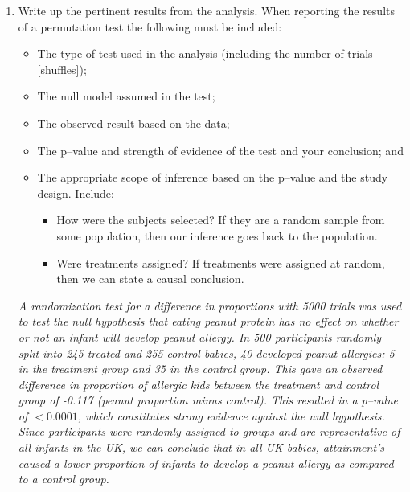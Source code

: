 \begin{enumerate}
    \item \label{reportBullets} Write up  the pertinent
      results from the analysis. When reporting the
      results of a permutation test the following must be included:
      \begin{itemize}
      \item The type of test used in the analysis (including the
        number of trials [shuffles]);\vspace{2cm}
      \item The null model assumed in the test;\vspace{2cm}
      \item The observed result based on the data;\vspace{2cm}
      \item The p--value and strength of evidence of the test and your
        conclusion; and\vspace{2cm}
      \item The appropriate scope of inference based on the p--value
        and the study design.  Include:
        \begin{itemize}
        \item How were the subjects selected?  If they are a random
          sample from some population, then our inference goes back to
          the population.\vspace{2cm}
        \item Were treatments assigned?  If treatments were assigned
          at random, then we can state a causal conclusion.\vspace{2cm}
        \end{itemize}
      \end{itemize}
\begin{key}
 {\it      A randomization test for a difference in proportions with
      5000 trials was used to test the null hypothesis that eating
      peanut protein has no effect on whether or not an infant will
      develop peanut allergy.  In 500 participants randomly split 
      into 245 treated and 255 control babies, 40 developed peanut
      allergies: 5 in the treatment group and 35  in the control
      group.  This gave an observed difference in
      proportion of allergic kids between the treatment and
      control group of -0.117 (peanut proportion minus control).  This
      resulted in a p--value of $< 0.0001$, which constitutes  strong
      evidence against the null hypothesis.  Since participants
      were randomly assigned to groups and are representative 
      of all infants in the UK, we can
      conclude that in all UK babies, attainment's caused a lower
      proportion of infants to develop a peanut allergy as compared to a
      control group.   
     }  
\end{key}

\end{enumerate}


